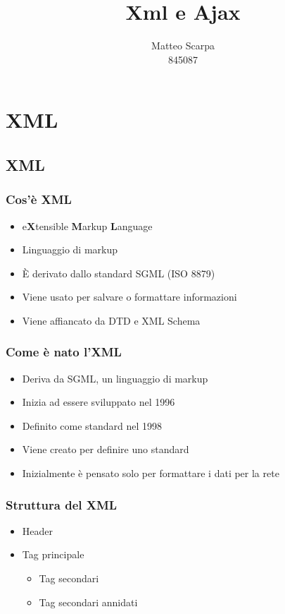 \documentclass{beamer}
\title{Xml e Ajax}
\author{Matteo Scarpa\\ 845087}
\date{}
\institute{Università Ca'Foscari}
\begin{document}
\begin{frame}
   \maketitle
\end{frame}

\section{XML}

\subsection{XML}
\begin{frame}
    \frametitle{Cos'è XML}
    \begin{itemize}
        \item <1->e\textbf{X}tensible \textbf{M}arkup \textbf{L}anguage
        \item <2->Linguaggio di markup
        \item <3->È derivato dallo standard SGML (ISO 8879)
        \item <4->Viene usato per salvare o formattare informazioni
        \item <5->Viene affiancato da DTD e XML Schema
    \end{itemize}
\end{frame}

\begin{frame}
    \frametitle{Come è nato l'XML}
    \begin{itemize}
    \item Deriva da SGML, un linguaggio di markup
    \item Inizia ad essere sviluppato nel 1996
    \item Definito come standard nel 1998
    \item Viene creato per definire uno standard
    \item Inizialmente è pensato solo per formattare i dati per la rete
    \end{itemize}

\end{frame}

\begin{frame}
    \frametitle{Struttura del XML}
    \begin{itemize}
        \item Header
        \item Tag principale
        \begin{itemize}
            \item Tag secondari
            \item Tag secondari annidati
        \end{itemize}
    \end{itemize}
\end{frame}
\end{document}

